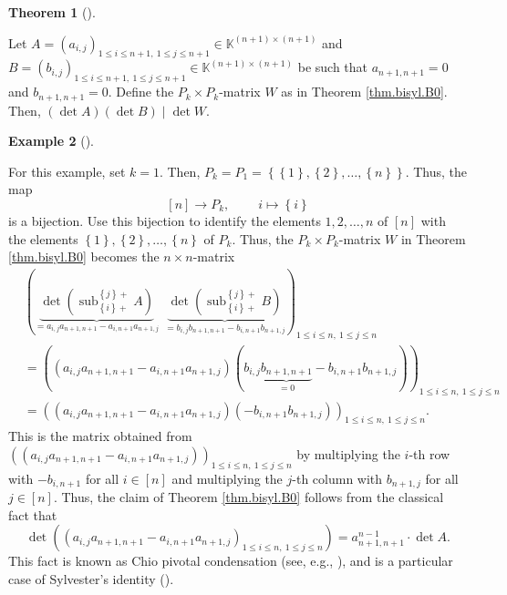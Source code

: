 \documentclass[numbers=enddot,12pt,final,onecolumn,notitlepage]{scrartcl}%
\theoremstyle{definition}
\newtheorem{theo}{Theorem}[section]
\newenvironment{theorem}[1][]
{\begin{theo}[#1]\begin{leftbar}}
{\end{leftbar}\end{theo}}
\newtheorem{exam}[theo]{Example}
\newenvironment{example}[1][]
{\begin{exam}[#1]\begin{leftbar}}
{\end{leftbar}\end{exam}}
\begin{document}
\begin{theorem}
\label{thm.bisyl.AB0}Let $A=\left(  a_{i,j}\right)  _{1\leq i\leq n+1,\ 1\leq
j\leq n+1}\in\mathbb{K}^{\left(  n+1\right)  \times\left(  n+1\right)  }$ and
$B=\left(  b_{i,j}\right)  _{1\leq i\leq n+1,\ 1\leq j\leq n+1}\in
\mathbb{K}^{\left(  n+1\right)  \times\left(  n+1\right)  }$ be such that
$a_{n+1,n+1}=0$ and $b_{n+1,n+1}=0$. Define the $P_{k}\times P_{k}$-matrix $W$
as in Theorem \ref{thm.bisyl.B0}. Then, $\left(  \det A\right)  \left(  \det
B\right)  \mid\det W$.
\end{theorem}


\begin{example}
\label{exa.k=1}For this example, set $k=1$. Then, $P_{k}=P_{1}=\left\{
\left\{  1\right\}  ,\left\{  2\right\}  ,\ldots,\left\{  n\right\}  \right\}
$. Thus, the map%
\[
\left[  n\right]  \rightarrow P_{k},\ \ \ \ \ \ \ \ \ \ i\mapsto\left\{
i\right\}
\]
is a bijection. Use this bijection to identify the elements $1,2,\ldots,n$ of
$\left[  n\right]  $ with the elements $\left\{  1\right\}  ,\left\{
2\right\}  ,\ldots,\left\{  n\right\}  $ of $P_{k}$. Thus, the $P_{k}\times
P_{k}$-matrix $W$ in Theorem \ref{thm.bisyl.B0} becomes the $n\times n$-matrix%
\begin{align*}
&  \left(  \underbrace{\det\left(  \operatorname*{sub}\nolimits_{\left\{
i\right\}  +}^{\left\{  j\right\}  +}A\right)  }_{=a_{i,j}a_{n+1,n+1}%
-a_{i,n+1}a_{n+1,j}}\ \ \underbrace{\det\left(  \operatorname*{sub}%
\nolimits_{\left\{  i\right\}  +}^{\left\{  j\right\}  +}B\right)  }%
_{=b_{i,j}b_{n+1,n+1}-b_{i,n+1}b_{n+1,j}}\right)  _{1\leq i\leq n,\ 1\leq
j\leq n}\\
&  =\left(  \left(  a_{i,j}a_{n+1,n+1}-a_{i,n+1}a_{n+1,j}\right)  \left(
b_{i,j}\underbrace{b_{n+1,n+1}}_{=0}-b_{i,n+1}b_{n+1,j}\right)  \right)
_{1\leq i\leq n,\ 1\leq j\leq n}\\
&  =\left(  \left(  a_{i,j}a_{n+1,n+1}-a_{i,n+1}a_{n+1,j}\right)  \left(
-b_{i,n+1}b_{n+1,j}\right)  \right)  _{1\leq i\leq n,\ 1\leq j\leq n}.
\end{align*}
This is the matrix obtained from $\left(  \left(  a_{i,j}a_{n+1,n+1}%
-a_{i,n+1}a_{n+1,j}\right)  \right)  _{1\leq i\leq n,\ 1\leq j\leq n}$ by
multiplying the $i$-th row with $-b_{i,n+1}$ for all $i\in\left[  n\right]  $
and multiplying the $j$-th column with $b_{n+1,j}$ for all $j\in\left[
n\right]  $. Thus, the claim of Theorem \ref{thm.bisyl.B0} follows from the
classical fact that%
\[
\det\left(  \left(  a_{i,j}a_{n+1,n+1}-a_{i,n+1}a_{n+1,j}\right)  _{1\leq
i\leq n,\ 1\leq j\leq n}\right)  =a_{n+1,n+1}^{n-1}\cdot\det A.
\]
This fact is known as Chio pivotal condensation (see, e.g., \cite[Theorem
0.1]{KarZha16}), and is a particular case of Sylvester's identity
(\cite[\S 2.7]{Prasolov}).
\end{example}
\end{document}
